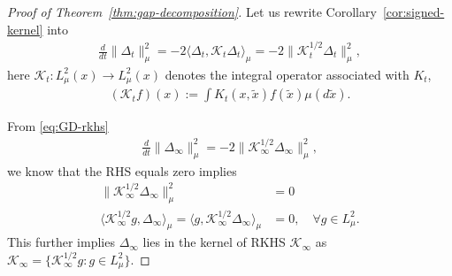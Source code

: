 \documentclass[11pt]{article}
\numberwithin{equation}{section}
\begin{document}
\begin{proof}[Proof of Theorem~\ref{thm:gap-decomposition}]
    
    Let us rewrite Corollary~\ref{cor:signed-kernel} into
    \begin{align}
        \label{eq:GD-rkhs}
         \frac{d}{dt} \| \Delta_t \|_\mu^2 = - 2 \langle \Delta_t, \mathcal{K}_t  \Delta_t \rangle_{\mu} = - 2 \| \mathcal{K}_t^{1/2} \Delta_t \|_{\mu}^2,
    \end{align}
    here $\mathcal{K}_t: L^2_\mu(x) \rightarrow L^2_\mu(x)$ denotes the integral operator associated with $K_t$,
    \begin{align}
        (\mathcal{K}_t f)(x) := \int  K_t( x, \tilde{x} ) f(\tilde{x})\mu(d\tilde{x}).
    \end{align}
    
    
    From \eqref{eq:GD-rkhs}
    \begin{align}
        \frac{d}{dt} \| \Delta_\infty \|_\mu^2 =  - 2 \| \mathcal{K}_\infty^{1/2} \Delta_\infty \|_{\mu}^2, 
    \end{align}
    we know that the RHS equals zero implies
    \begin{align*}
        \| \mathcal{K}_\infty^{1/2} \Delta_\infty \|_{\mu}^2 &= 0 \\
        \langle \mathcal{K}_\infty^{1/2} g,  \Delta_\infty \rangle_\mu = \langle g, \mathcal{K}_\infty^{1/2} \Delta_\infty \rangle_\mu &= 0, \quad \forall g \in L^2_\mu.
    \end{align*}
    This further implies $\Delta_\infty$ lies in the kernel of RKHS $\mathcal{K}_\infty$ as $\mathcal{K}_\infty = \{ \mathcal{K}_\infty^{1/2} g: g \in L^2_\mu\}$.
\end{proof}
\end{document}
